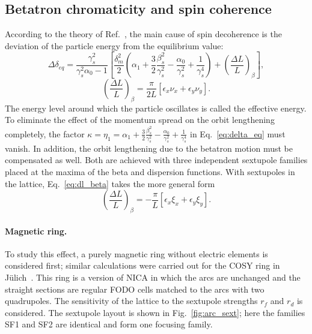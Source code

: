 \documentclass[%
  aps,
  pra,
  preprint,
  a4paper,
  amsmath,
  amssymb,
  floatfix,
  longbibliography,
  superscriptaddress
]{revtex4-2}
\begin{document}
\subsection{Betatron chromaticity and spin coherence}

According to the theory of Ref.~\cite{Melnikov:2023_jetpl_decoherence}, the main cause of
spin decoherence is the deviation of the particle energy from the equilibrium
value:
\begin{equation}
  \Delta\delta_{eq} = \frac{\gamma_s^2}{\gamma_s^2\alpha_0-1}
  \left[\frac{\delta_m^2}{2}\left(\alpha_1+\frac{3}{2}\frac{\beta_s^2}{\gamma_s^2}
  -\frac{\alpha_0}{\gamma_s^2}+\frac{1}{\gamma_s^4}\right)
  + \left(\frac{\Delta L}{L}\right)_\beta\right],
  \label{eq:delta_eq}
\end{equation}
\begin{equation}
  \left(\frac{\Delta L}{L}\right)_\beta = \frac{\pi}{2L}\left[\epsilon_x\nu_x+\epsilon_y\nu_y\right].
  \label{eq:dl_beta}
\end{equation}
The energy level around which the particle oscillates is called the effective
energy. To eliminate the effect of the momentum spread on the orbit
lengthening completely, the factor
$\kappa = \eta_1 = \alpha_1+\frac{3}{2}\frac{\beta_s^2}{\gamma_s^2}
-\frac{\alpha_0}{\gamma_s^2}+\frac{1}{\gamma_s^4}$
in Eq.~\eqref{eq:delta_eq} must vanish. In addition, the orbit lengthening
due to the betatron motion must be compensated as well. Both are achieved with
three independent sextupole families placed at the maxima of the beta and
dispersion functions. With sextupoles in the lattice, Eq.~\eqref{eq:dl_beta}
takes the more general form~\cite{Melnikov:2022xao}
\begin{equation}
  \left(\frac{\Delta L}{L}\right)_\beta = -\frac{\pi}{L}\left[\epsilon_x\xi_x+\epsilon_y\xi_y\right].
  \label{eq:dl_beta_sext}
\end{equation}

\paragraph{Magnetic ring.}
To study this effect, a purely magnetic ring without electric elements is
considered first; similar calculations were carried out for the COSY ring in
J\"ulich~\cite{Melnikov:2022xao}. This ring is a version of NICA in which the
arcs are unchanged and the straight sections are regular FODO cells matched to
the arcs with two quadrupoles. The sensitivity of the lattice to the sextupole
strengths $r_f$ and $r_d$ is considered. The sextupole layout is shown in
Fig.~\ref{fig:arc_sext}; here the families SF1 and SF2 are identical and form
one focusing family.
\end{document}
